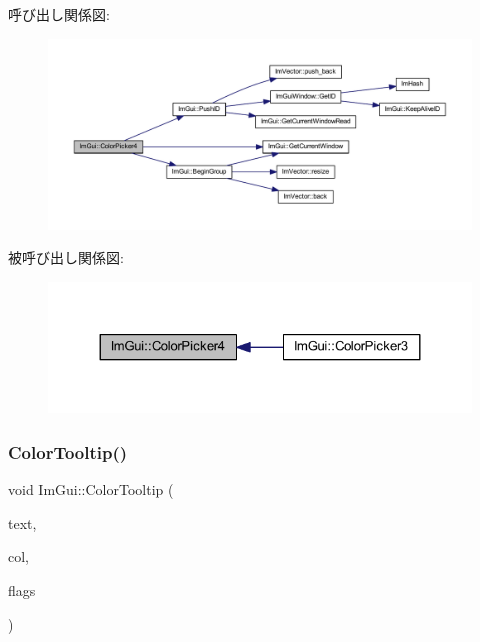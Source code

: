 呼び出し関係図\+:\nopagebreak
\begin{figure}[H]
\begin{center}
\leavevmode
\includegraphics[width=350pt]{namespace_im_gui_a3d5aae9e0a14aa051d5a799abbe97b32_cgraph}
\end{center}
\end{figure}
被呼び出し関係図\+:\nopagebreak
\begin{figure}[H]
\begin{center}
\leavevmode
\includegraphics[width=324pt]{namespace_im_gui_a3d5aae9e0a14aa051d5a799abbe97b32_icgraph}
\end{center}
\end{figure}
\mbox{\label{namespace_im_gui_afad90b366b6471e3b13175c0ebeb26c8}} 
\subsubsection{\texorpdfstring{Color\+Tooltip()}{ColorTooltip()}}
{\footnotesize\ttfamily void Im\+Gui\+::\+Color\+Tooltip (\begin{DoxyParamCaption}\item[{const char $\ast$}]{text,  }\item[{const float $\ast$}]{col,  }\item[{\mbox{\hyperlink{imgui_8h_a6b2d5e95adc38f22c021252189f669c6}{Im\+Gui\+Color\+Edit\+Flags}}}]{flags }\end{DoxyParamCaption})}



